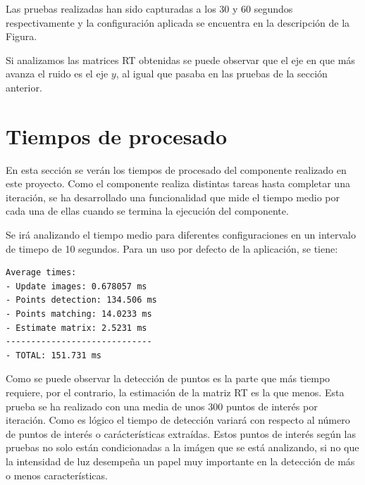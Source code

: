 %

Las pruebas realizadas han sido capturadas a los 30 y 60 segundos respectivamente y la configuración aplicada se encuentra en la descripción de la Figura.

Si analizamos las matrices RT obtenidas se puede observar que el eje en que más avanza el ruido es el eje $y$, al igual que pasaba en las pruebas de la sección anterior.


\newpage
\section{Tiempos de procesado}
En esta sección se verán los tiempos de procesado del componente realizado en este proyecto. Como el componente realiza distintas tareas hasta completar una iteración, se ha desarrollado una funcionalidad que mide el tiempo medio por cada una de ellas cuando se termina la ejecución del componente.

Se irá analizando el tiempo medio para diferentes configuraciones en un intervalo de timepo de 10 segundos. Para un uso por defecto de la aplicación, se tiene:

\begin{lstlisting}[style=CStyle]
Average times:
- Update images: 0.678057 ms
- Points detection: 134.506 ms
- Points matching: 14.0233 ms
- Estimate matrix: 2.5231 ms
-----------------------------
- TOTAL: 151.731 ms
\end{lstlisting}

Como se puede observar la detección de puntos es la parte que más tiempo requiere, por el contrario, la estimación de la matriz RT es la que menos. Esta prueba se ha realizado con una media de unos 300 puntos de interés por iteración. Como es lógico el tiempo de detección variará con respecto al número de puntos de interés o carácterísticas extraídas. Estos puntos de interés según las pruebas no solo están condicionadas a la imágen que se está analizando, si no que la intensidad de luz desempeña un papel muy importante en la detección de más o menos características.

